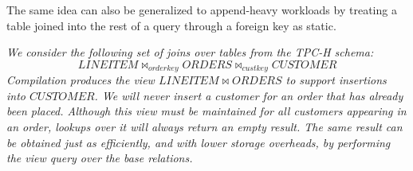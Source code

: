 The same idea can also be generalized to append-heavy workloads by treating a table joined into the rest of a query through a foreign key as static.  

\begin{example} \em
We consider the following set of joins over tables from the TPC-H\cite{counciltpc} schema:
$$LINEITEM \bowtie_{orderkey} ORDERS \bowtie_{custkey} CUSTOMER$$
Compilation produces the view $LINEITEM \bowtie ORDERS$ to support insertions into $CUSTOMER$.  We will never insert a customer for an order that has already been placed.  Although this view must be maintained for all customers appearing in an order, lookups over it will always return an empty result.  The same result can be obtained just as efficiently, and with lower storage overheads, by performing the view query over the base relations. 
\end{example}
